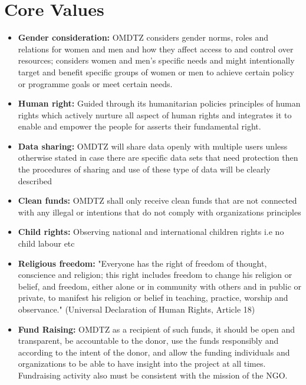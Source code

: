 \documentclass[a4paper,12pt,twoside]{article}
\begin{document}
\section{Core Values}
\begin{itemize}

\item \textbf{Gender consideration:} OMDTZ considers gender norms, roles and relations for women and men and how they affect access to and control over resources; considers women and men's specific needs and might intentionally target and benefit specific groups of women or men to achieve certain policy or programme goals or meet certain needs.

\item \textbf{Human right:} Guided through its humanitarian policies principles of human rights which actively nurture all aspect of human rights and integrates it to enable and empower the people for asserts their fundamental right.

\item \textbf{Data sharing:}  OMDTZ  will share data openly with multiple users unless otherwise stated in case there are specific data sets that need protection then the procedures of sharing and use of these type of data will be clearly described

\item\textbf{Clean funds:}  OMDTZ shall only receive clean funds that are not connected with any illegal or intentions that do not comply with organizations principles

\item\textbf{Child rights:} Observing national and international children rights i.e no child labour etc

\item \textbf{Religious freedom:} "Everyone has the right of freedom of thought, conscience and religion; this right includes freedom to change his religion or belief, and freedom, either alone or in community with others and in public or private, to manifest his religion or belief in teaching, practice, worship and observance." (Universal Declaration of Human Rights, Article 18)

\item\textbf{Fund Raising: }OMDTZ as a recipient of such funds, it should be open and transparent, be accountable to the donor, use the funds responsibly and according to the intent of the donor, and allow the funding individuals and organizations to be able to have insight into the project at all times. Fundraising activity also must be consistent with the mission of the NGO.
\end{itemize}
\end{document}
